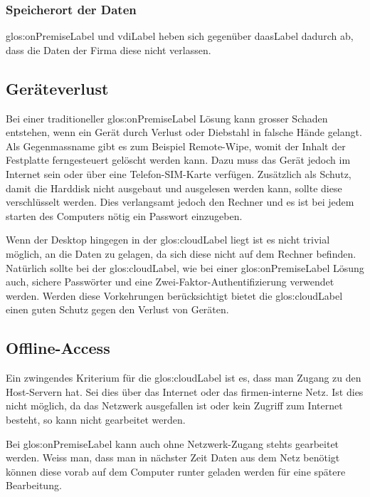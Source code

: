 \subsubsection{Speicherort der Daten}
\Gls{glos:onPremiseLabel} und \Gls{vdiLabel} heben sich gegenüber \Gls{daasLabel} dadurch ab, dass die Daten der Firma diese nicht verlassen.

\subsection{Geräteverlust}
Bei einer traditioneller \gls{glos:onPremiseLabel} Lösung kann grosser Schaden entstehen, wenn ein Gerät durch Verlust oder Diebstahl in falsche Hände gelangt.
Als Gegenmassname gibt es zum Beispiel Remote-Wipe, womit der Inhalt der Festplatte ferngesteuert gelöscht werden kann. Dazu muss das Gerät jedoch im Internet sein oder über eine Telefon-SIM-Karte verfügen.
Zusätzlich als Schutz, damit die Harddisk nicht ausgebaut und ausgelesen werden kann, sollte diese verschlüsselt werden. Dies verlangsamt jedoch den Rechner und es ist bei jedem starten des Computers nötig ein Passwort einzugeben.

Wenn der Desktop hingegen in der \Gls{glos:cloudLabel} liegt ist es nicht trivial möglich, an die Daten zu gelagen, da sich diese nicht auf dem Rechner befinden.
Natürlich sollte bei der \Gls{glos:cloudLabel}, wie bei einer \gls{glos:onPremiseLabel} Lösung auch, sichere Passwörter und eine Zwei-Faktor-Authentifizierung verwendet werden. Werden diese Vorkehrungen berücksichtigt bietet die \Gls{glos:cloudLabel} einen guten Schutz gegen den Verlust von Geräten.

\subsection{Offline-Access}
Ein zwingendes Kriterium für die \Gls{glos:cloudLabel} ist es, dass man Zugang zu den Host-Servern hat. Sei dies über das Internet oder das firmen-interne Netz. Ist dies nicht möglich, da das Netzwerk ausgefallen ist oder kein Zugriff zum Internet besteht, so kann nicht gearbeitet werden.

Bei \gls{glos:onPremiseLabel} kann auch ohne Netzwerk-Zugang stehts gearbeitet werden. Weiss man, dass man in nächster Zeit Daten aus dem Netz benötigt können diese vorab auf dem Computer runter geladen werden für eine spätere Bearbeitung.

